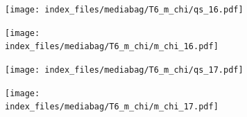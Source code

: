 \documentclass[
  11pt,
  letterpaper,
]{scrreprt}
\begin{document}
\begin{figure}

\begin{minipage}{0.50\linewidth}

\begin{figure}[H]

{\centering \texttt{[image: index\_files/mediabag/T6\_m\_chi/qs\_16.pdf]}

}


\end{figure}%

\end{minipage}%
%
\begin{minipage}{0.50\linewidth}

\begin{figure}[H]

{\centering \texttt{[image: index\_files/mediabag/T6\_m\_chi/m\_chi\_16.pdf]}

}


\end{figure}%

\end{minipage}%

\end{figure}%

\begin{figure}

\begin{minipage}{0.50\linewidth}

\begin{figure}[H]

{\centering \texttt{[image: index\_files/mediabag/T6\_m\_chi/qs\_17.pdf]}

}


\end{figure}%

\end{minipage}%
%
\begin{minipage}{0.50\linewidth}

\begin{figure}[H]

{\centering \texttt{[image: index\_files/mediabag/T6\_m\_chi/m\_chi\_17.pdf]}

}


\end{figure}%

\end{minipage}%

\end{figure}%
\end{document}
